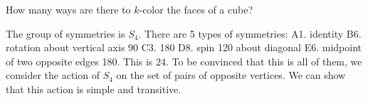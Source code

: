 \documentclass[12pt,class=article,crop=false]{standalone}
\begin{document}
\begin{eg}[2]
How many ways are there to $ k$-color the faces of a cube?

The group of symmetries is  $ S_4$. There are 5 types of symmetries: A1. identity B6. rotation about vertical axis 90 C3. 180 D8. spin 120 about diagonal E6. midpoint of two opposite edges 180. This is 24. To be convinced that this is all of them, we consider the action of $ S_4$ on the set of pairs of opposite vertices. We can show that this action is simple and transitive.
\end{eg}
\end{document}
